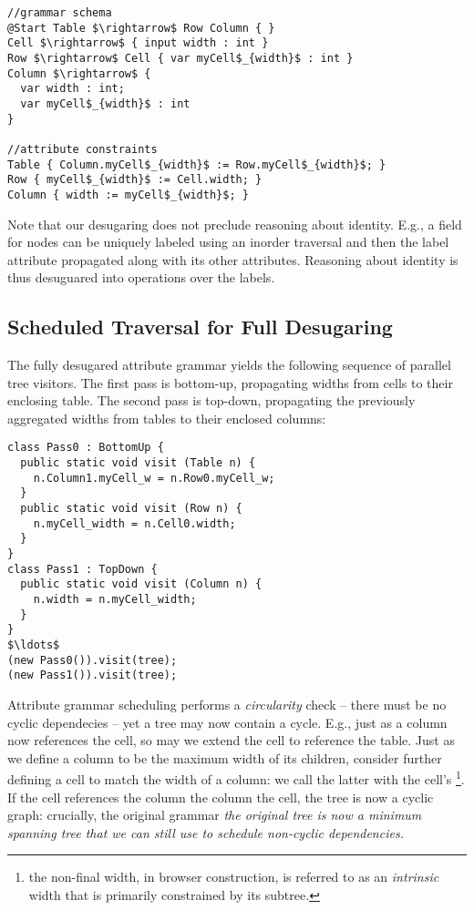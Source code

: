 \begin{lstlisting}[mathescape]
//grammar schema
@Start Table $\rightarrow$ Row Column { }
Cell $\rightarrow$ { input width : int }
Row $\rightarrow$ Cell { var myCell$_{width}$ : int }
Column $\rightarrow$ { 
  var width : int; 
  var myCell$_{width}$ : int 
}

//attribute constraints
Table { Column.myCell$_{width}$ := Row.myCell$_{width}$; }
Row { myCell$_{width}$ := Cell.width; }
Column { width := myCell$_{width}$; }
\end{lstlisting}

Note that our desugaring does not preclude reasoning about identity. E.g., a  field for nodes can be uniquely labeled using an inorder traversal and then the label attribute propagated along with its other attributes. Reasoning about identity is thus desuguared into operations over the labels.

\subsection{Scheduled Traversal for Full Desugaring}

The fully desugared attribute grammar yields the following sequence of parallel tree visitors. The first pass is bottom-up, propagating widths from cells to their enclosing table. The second pass is top-down, propagating the previously aggregated widths from tables to their enclosed columns:

\begin{lstlisting}[mathescape]
class Pass0 : BottomUp {
  public static void visit (Table n) {
    n.Column1.myCell_w = n.Row0.myCell_w;
  }
  public static void visit (Row n) {
    n.myCell_width = n.Cell0.width;
  }
}
class Pass1 : TopDown {
  public static void visit (Column n) { 
    n.width = n.myCell_width; 
  }
}
$\ldots$
(new Pass0()).visit(tree);
(new Pass1()).visit(tree);
\end{lstlisting}

Attribute grammar scheduling performs a \emph{circularity} check -- there must be no cyclic dependecies -- yet a tree may now contain a cycle. E.g., just as a column now references the cell, so may we extend the cell to reference the table. Just as we define a column to be the maximum width of its children, consider further defining a cell to match the width of a column: we call the latter with the cell's \footnote{the non-final width, in browser construction, is referred to as an \emph{intrinsic} width that is primarily constrained by its subtree.}. If the cell references the column the column the cell, the tree is now a cyclic graph: crucially, the original grammar \emph{the original tree is now a minimum spanning tree that we can still use to schedule non-cyclic dependencies.} 

